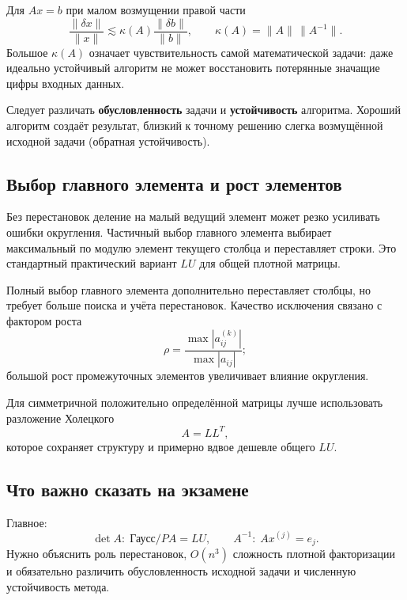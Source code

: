 Для $Ax=b$ при малом возмущении правой части
\[
\frac{\|\delta x\|}{\|x\|}
\lesssim
\kappa(A)\frac{\|\delta b\|}{\|b\|},
\qquad
\kappa(A)=\|A\|\,\|A^{-1}\|.
\]
Большое $\kappa(A)$ означает чувствительность самой математической задачи:
даже идеально устойчивый алгоритм не может восстановить потерянные значащие
цифры входных данных.

Следует различать \textbf{обусловленность} задачи и \textbf{устойчивость}
алгоритма. Хороший алгоритм создаёт результат, близкий к точному решению слегка
возмущённой исходной задачи (обратная устойчивость).

\subsection{Выбор главного элемента и рост элементов}

Без перестановок деление на малый ведущий элемент может резко усиливать ошибки
округления. Частичный выбор главного элемента выбирает максимальный по модулю
элемент текущего столбца и переставляет строки. Это стандартный практический
вариант $LU$ для общей плотной матрицы.

Полный выбор главного элемента дополнительно переставляет столбцы, но требует
больше поиска и учёта перестановок. Качество исключения связано с фактором роста
\[
\rho=\frac{\max|a_{ij}^{(k)}|}{\max|a_{ij}|};
\]
большой рост промежуточных элементов увеличивает влияние округления.

Для симметричной положительно определённой матрицы лучше использовать
разложение Холецкого
\[
A=LL^T,
\]
которое сохраняет структуру и примерно вдвое дешевле общего $LU$.


\subsection{Что важно сказать на экзамене}

Главное:
\[
\boxed{
\det A:\; \text{Гаусс}/PA=LU,
\qquad
A^{-1}:\; Ax^{(j)}=e_j.
}
\]
Нужно объяснить роль перестановок, $O(n^3)$ сложность плотной факторизации и обязательно различить обусловленность исходной задачи и численную устойчивость метода.

\newpage
